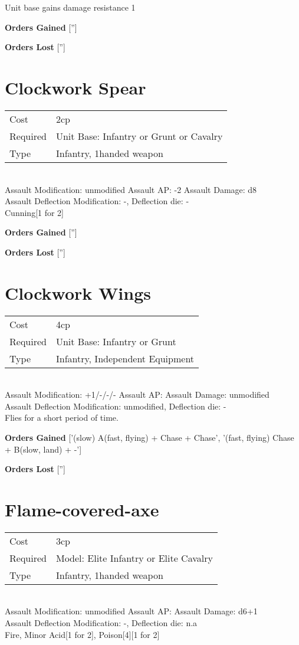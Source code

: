 Unit base gains damage resistance 1

{\bf Orders Gained}
['']

{\bf Orders Lost}
['']
\section{ Clockwork Spear }

\begin{tabular}{ll}
    Cost & 2cp \\
    Required & Unit Base: Infantry or Grunt or Cavalry\\
    Type & Infantry, 1handed weapon\\
\end{tabular}
\ \\
Assault Modification: unmodified Assault AP: -2 Assault Damage: d8\\
Assault Deflection Modification: -, Deflection die: - \\
Cunning[1 for 2]



{\bf Orders Gained}
['']

{\bf Orders Lost}
['']
\section{ Clockwork Wings }

\begin{tabular}{ll}
    Cost & 4cp \\
    Required & Unit Base: Infantry or Grunt\\
    Type & Infantry, Independent Equipment\\
\end{tabular}
\ \\
Assault Modification: +1/-/-/- Assault AP:  Assault Damage: unmodified\\
Assault Deflection Modification: unmodified, Deflection die: - \\


Flies for a short period of time.

{\bf Orders Gained}
['(slow) A(fast, flying) + Chase + Chase', '(fast, flying) Chase + B(slow, land) + -']

{\bf Orders Lost}
['']
\section{ Flame-covered-axe }

\begin{tabular}{ll}
    Cost & 3cp \\
    Required & Model: Elite Infantry or Elite Cavalry\\
    Type & Infantry, 1handed weapon\\
\end{tabular}
\ \\
Assault Modification: unmodified Assault AP:  Assault Damage: d6+1\\
Assault Deflection Modification: -, Deflection die: n.a \\
Fire, Minor Acid[1 for 2], Poison[4][1 for 2]



